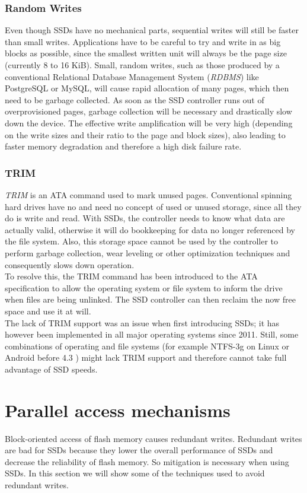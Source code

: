 \documentclass{acm_proc_article-sp}
\begin{document}
\subsubsection*{Random Writes}
Even though SSDs have no mechanical parts, sequential writes will still be faster than small writes. Applications have to be careful to try and write in as big blocks as possible, since the smallest written unit will always be the page size (currently 8 to 16 KiB). Small, random writes, such as those produced by a conventional Relational Database Management System (\emph{RDBMS}) like PostgreSQL or MySQL, will cause rapid allocation of many pages, which then need to be garbage collected. As soon as the SSD controller runs out of overprovisioned pages, garbage collection will be necessary and drastically slow down the device. The effective write amplification will be very high (depending on the write sizes and their ratio to the page and block sizes), also leading to faster memory degradation and therefore a high disk failure rate.

\subsubsection*{TRIM}
\emph{TRIM} is an ATA command used to mark unused pages. Conventional spinning hard drives have no and need no concept of used or unused storage, since all they do is write and read. With SSDs, the controller needs to know what data are actually valid, otherwise it will do bookkeeping for data no longer referenced by the file system. Also, this storage space cannot be used by the controller to perform garbage collection, wear leveling or other optimization techniques and consequently slows down operation.
\\
To resolve this, the TRIM command has been introduced to the ATA specification to allow the operating system or file system to inform the drive when files are being unlinked. The SSD controller can then reclaim the now free space and use it at will.
\\
The lack of TRIM support was an issue when first introducing SSDs; it has however been implemented in all major operating systems since 2011. Still, some combinations of operating and file systems (for example NTFS-3g on Linux or Android before 4.3 \cite{androidtrim}) might lack TRIM support and therefore cannot take full advantage of SSD speeds.

\section{Parallel access mechanisms}
Block-oriented access of flash memory causes re\-dundant wri\-tes. Redundant writes are bad for SSDs because they lower the overall performance of SSDs and decrease the reliability of flash memory. So mitigation is necessary when using SSDs. In this section we will show some of the techniques used to avoid redundant writes.
\end{document}
